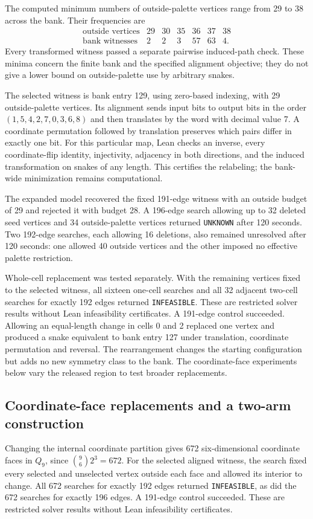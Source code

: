 \documentclass[11pt,a4paper]{article}
\theoremstyle{definition}
\theoremstyle{remark}
\begin{document}
The computed minimum numbers of outside-palette vertices range from 29 to 38 across the bank. Their frequencies are
\[
\begin{array}{c|rrrrrr}
\text{outside vertices}&29&30&35&36&37&38\\\hline
\text{bank witnesses}&2&2&3&57&63&4.
\end{array}
\]
Every transformed witness passed a separate pairwise induced-path check. These minima concern the finite bank and the specified alignment objective; they do not give a lower bound on outside-palette use by arbitrary snakes.

The selected witness is bank entry 129, using zero-based indexing, with 29 outside-palette vertices. Its alignment sends input bits to output bits in the order $(1,5,4,2,7,0,3,6,8)$ and then translates by the word with decimal value 7. A coordinate permutation followed by translation preserves which pairs differ in exactly one bit. For this particular map, Lean checks an inverse, every coordinate-flip identity, injectivity, adjacency in both directions, and the induced transformation on snakes of any length. This certifies the relabeling; the bank-wide minimization remains computational.

The expanded model recovered the fixed 191-edge witness with an outside budget of 29 and rejected it with budget 28. A 196-edge search allowing up to 32 deleted seed vertices and 34 outside-palette vertices returned \texttt{UNKNOWN} after 120 seconds. Two 192-edge searches, each allowing 16 deletions, also remained unresolved after 120 seconds: one allowed 40 outside vertices and the other imposed no effective palette restriction.

Whole-cell replacement was tested separately. With the remaining vertices fixed to the selected witness, all sixteen one-cell searches and all 32 adjacent two-cell searches for exactly 192 edges returned \texttt{INFEASIBLE}. These are restricted solver results without Lean infeasibility certificates. A 191-edge control succeeded. Allowing an equal-length change in cells 0 and 2 replaced one vertex and produced a snake equivalent to bank entry 127 under translation, coordinate permutation and reversal. The rearrangement changes the starting configuration but adds no new symmetry class to the bank. The coordinate-face experiments below vary the released region to test broader replacements.

\subsection{Coordinate-face replacements and a two-arm construction}
Changing the internal coordinate partition gives 672 six-dimensional coordinate faces in $Q_9$, since $\binom96 2^3=672$. For the selected aligned witness, the search fixed every selected and unselected vertex outside each face and allowed its interior to change. All 672 searches for exactly 192 edges returned \texttt{INFEASIBLE}, as did the 672 searches for exactly 196 edges. A 191-edge control succeeded. These are restricted solver results without Lean infeasibility certificates.
\end{document}
